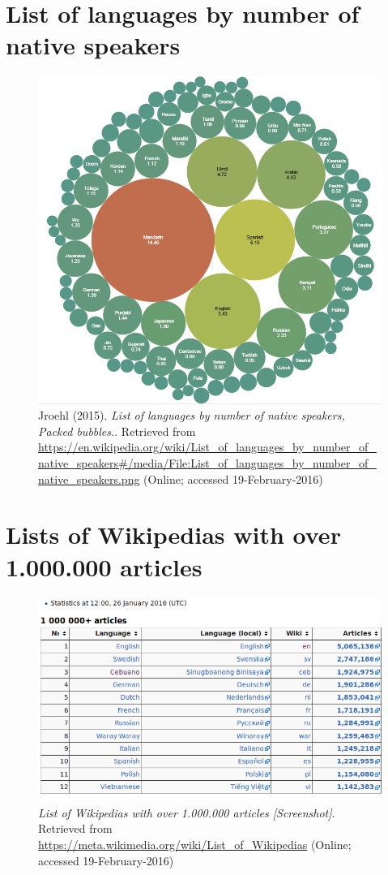 \section{List of languages by number of native speakers}
\begin{figure}[H]
	\centering
	\includegraphics[width=\textwidth]{diagrams/List_of_languages_by_number_of_native_speakers.png}
	\caption[a figure]{Jroehl (2015). \textit{List of languages by number of native speakers, Packed bubbles.}. Retrieved from \url{https://en.wikipedia.org/wiki/List\_of\_languages\_by\_number\_of\_native\_speakers\#/media/File:List\_of\_languages\_by\_number\_of\_native\_speakers.png} (Online; accessed 19-February-2016)}
	\label{fig:listLang}
\end{figure}

\section{Lists of Wikipedias with over 1.000.000 articles}
\begin{figure}[H]
	\centering
	\includegraphics[width=\textwidth]{diagrams/list-of-wikis-articles.png}
	\caption[a figure]{\textit{List of Wikipedias with over 1.000.000 articles [Screenshot]}. Retrieved from \url{https://meta.wikimedia.org/wiki/List\_of\_Wikipedias} (Online; accessed 19-February-2016)}
	\label{fig:wikipedias-articles}
\end{figure}
